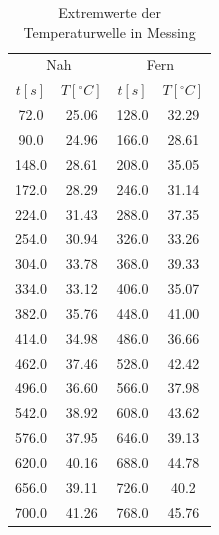\documentclass[11pt]{article}
\begin{document}
\begin{table}[P]
\centering
\label{messing_extr}
\begin{tabular}{c|c||c|c|}
\multicolumn{2}{c||}{Nah} & \multicolumn{2}{c}{Fern}\\
$t[s]$ & $T[^\circ C]$ & $t[s]$ & $T[^\circ C]$ \\
\hline
\hline
72.0 & 25.06 & 128.0 & 32.29\\
90.0 & 24.96 & 166.0 & 28.61\\
148.0 & 28.61 & 208.0 & 35.05\\
172.0 & 28.29 & 246.0 & 31.14\\
224.0 & 31.43 & 288.0 & 37.35\\
254.0 & 30.94 & 326.0 & 33.26\\
304.0 & 33.78 & 368.0 & 39.33\\
334.0 & 33.12 & 406.0 & 35.07\\
382.0 & 35.76 & 448.0 & 41.00\\
414.0 & 34.98 & 486.0 & 36.66\\
462.0 & 37.46 & 528.0 & 42.42\\
496.0 & 36.60 & 566.0 & 37.98\\
542.0 & 38.92 & 608.0 & 43.62\\
576.0 & 37.95 & 646.0 & 39.13\\
620.0 & 40.16 & 688.0 & 44.78\\
656.0 & 39.11 & 726.0 & 40.2\\
700.0 & 41.26 & 768.0 & 45.76\\
\hline
\end{tabular}
\caption{Extremwerte der Temperaturwelle in Messing}
\end{table}
\end{document}
